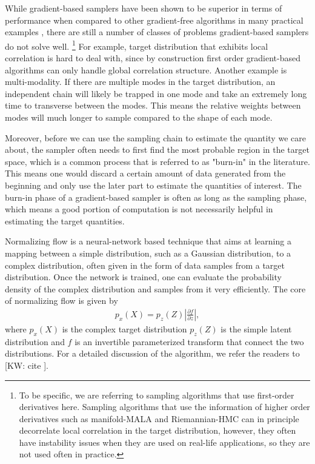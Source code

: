\documentclass[twocolumn]{aastex631}
\newcommand{\kw}[1]{{\color{rb4}[KW: #1 ]}}
\begin{document}
While gradient-based samplers have been shown to be superior in terms of
performance when compared to other gradient-free algorithms in many practical
examples , there are still a number of classes of problems
gradient-based samplers do not solve well. \footnote{To be specific, we are
referring to sampling algorithms that use first-order derivatives here. Sampling
algorithms that use the information of higher order derivatives such as manifold-MALA
and Riemannian-HMC \cite{RMHMC} can in principle decorrelate local correlation in the target
distribution, however, they often have instability issues when they are used on
real-life applications, so they are not used often in practice.} For example,
target distribution that exhibits local correlation is hard to deal with,
since by construction first order gradient-based algorithms can only handle
global correlation structure. Another example is multi-modality. If there are
multiple modes in the target distribution, an independent chain will likely 
be trapped in one mode and take an extremely long time to transverse between the
modes. This means the relative weights between modes will much longer to sample
compared to the shape of each mode.

Moreover, before we can use the sampling chain to estimate the quantity we care about,
the sampler often needs to first find the most probable region in the target
space, which is a common process that is referred to as "burn-in" in the
literature. This means one would discard a certain amount of data generated from
the beginning and only use the later part to estimate the quantities of
interest. The burn-in phase of a gradient-based sampler is often as long as the
sampling phase, which means a good portion of computation is not necessarily
helpful in estimating the target quantities.

Normalizing flow is a neural-network based technique that aims at learning a
mapping between a simple distribution, such as a Gaussian distribution, to a
complex distribution, often given in the form of data samples from a target
distribution. Once the network is trained, one can evaluate the probability
density of the complex distribution and samples from it very efficiently.
The core of normalizing flow is given by
\begin{align}
    p_x(X) = p_z(Z) \left| \frac{\partial f}{\partial z}\right|,
\end{align}
where $p_x(X)$ is the complex target distribution $p_z(Z)$ is the simple latent
distribution and $f$ is an invertible parameterized transform that
connect the two distributions. For a detailed discussion of the algorithm, we
refer the readers to \kw{cite}.
\end{document}
